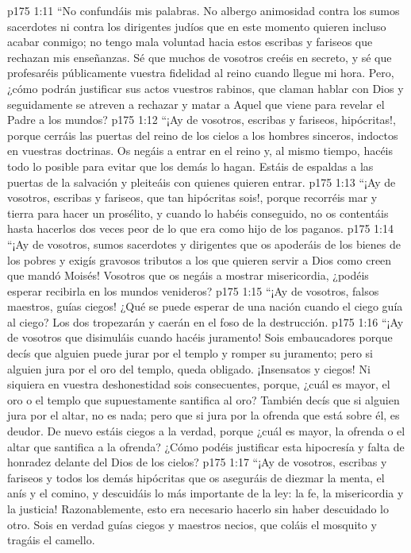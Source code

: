 \vs p175 1:11 “No confundáis mis palabras. No albergo animosidad contra los sumos sacerdotes ni contra los dirigentes judíos que en este momento quieren incluso acabar conmigo; no tengo mala voluntad hacia estos escribas y fariseos que rechazan mis enseñanzas. Sé que muchos de vosotros creéis en secreto, y sé que profesaréis públicamente vuestra fidelidad al reino cuando llegue mi hora. Pero, ¿cómo podrán justificar sus actos vuestros rabinos, que claman hablar con Dios y seguidamente se atreven a rechazar y matar a Aquel que viene para revelar el Padre a los mundos?
\vs p175 1:12 “¡Ay de vosotros, escribas y fariseos, hipócritas!, porque cerráis las puertas del reino de los cielos a los hombres sinceros, indoctos en vuestras doctrinas. Os negáis a entrar en el reino y, al mismo tiempo, hacéis todo lo posible para evitar que los demás lo hagan. Estáis de espaldas a las puertas de la salvación y pleiteáis con quienes quieren entrar.
\vs p175 1:13 “¡Ay de vosotros, escribas y fariseos, que tan hipócritas sois!, porque recorréis mar y tierra para hacer un prosélito, y cuando lo habéis conseguido, no os contentáis hasta hacerlos dos veces peor de lo que era como hijo de los paganos.
\vs p175 1:14 “¡Ay de vosotros, sumos sacerdotes y dirigentes que os apoderáis de los bienes de los pobres y exigís gravosos tributos a los que quieren servir a Dios como creen que mandó Moisés! Vosotros que os negáis a mostrar misericordia, ¿podéis esperar recibirla en los mundos venideros?
\vs p175 1:15 “¡Ay de vosotros, falsos maestros, guías ciegos! ¿Qué se puede esperar de una nación cuando el ciego guía al ciego? Los dos tropezarán y caerán en el foso de la destrucción.
\vs p175 1:16 “¡Ay de vosotros que disimuláis cuando hacéis juramento! Sois embaucadores porque decís que alguien puede jurar por el templo y romper su juramento; pero si alguien jura por el oro del templo, queda obligado. ¡Insensatos y ciegos! Ni siquiera en vuestra deshonestidad sois consecuentes, porque, ¿cuál es mayor, el oro o el templo que supuestamente santifica al oro? También decís que si alguien jura por el altar, no es nada; pero que si jura por la ofrenda que está sobre él, es deudor. De nuevo estáis ciegos a la verdad, porque ¿cuál es mayor, la ofrenda o el altar que santifica a la ofrenda? ¿Cómo podéis justificar esta hipocresía y falta de honradez delante del Dios de los cielos?
\vs p175 1:17 “¡Ay de vosotros, escribas y fariseos y todos los demás hipócritas que os aseguráis de diezmar la menta, el anís y el comino, y descuidáis lo más importante de la ley: la fe, la misericordia y la justicia! Razonablemente, esto era necesario hacerlo sin haber descuidado lo otro. Sois en verdad guías ciegos y maestros necios, que coláis el mosquito y tragáis el camello.
